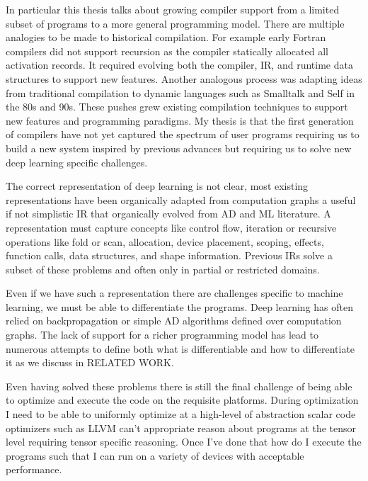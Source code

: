 In particular this thesis talks about growing compiler support from
  a limited subset of programs to a more general programming model.
There are multiple analogies to be made to historical compilation.
For example early Fortran compilers did not support recursion
  as the compiler statically allocated all activation records.
It required evolving both the compiler, IR, and runtime data structures
  to support new features.
Another analogous process was adapting ideas from traditional compilation
  to dynamic languages such as Smalltalk and Self in the 80s and 90s.
These pushes grew existing compilation techniques to support new features
  and programming paradigms.
My thesis is that the first generation of compilers have not yet
  captured the spectrum of user programs requiring us to build
  a new system inspired by previous advances but requiring
  us to solve new deep learning specific challenges.

The correct representation of deep learning is not clear, most
  existing representations have been organically adapted from
  computation graphs a useful if not simplistic IR that organically
  evolved from AD and ML literature.
A representation must capture concepts like control flow, iteration
  or recursive operations like fold or scan, allocation,
  device placement, scoping, effects, function calls, data structures,
  and shape information.
Previous IRs solve a subset of these problems and often only in partial
  or restricted domains.

Even if we have such a representation there are challenges specific to
 machine learning, we must be able to differentiate the programs.
Deep learning has often relied on backpropagation or simple AD algorithms
  defined over computation graphs.
The lack of support for a richer programming model has lead to numerous
  attempts to define both what is differentiable and how to differentiate
  it as we discuss in RELATED WORK.

Even having solved these problems there is still the final challenge of being
  able to optimize and execute the code on the requisite platforms.
During optimization I need to be able to uniformly optimize at a high-level
  of abstraction scalar code optimizers such as LLVM can't appropriate reason
  about programs at the tensor level requiring tensor specific reasoning.
Once I've done that how do I execute the programs such that I can run
  on a variety of devices with acceptable performance.


